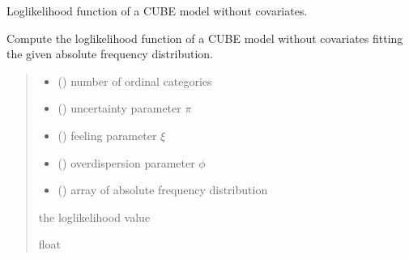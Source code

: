 \documentclass[letterpaper,10pt,english]{sphinxmanual}
\begin{document}

\begin{fulllineitems}
\label{\detokenize{cubmods:cubmods.cube.loglik}}
\pysigstartsignatures
{}
\pysigstopsignatures
\sphinxAtStartPar
Log\sphinxhyphen{}likelihood function of a CUBE model without covariates.

\sphinxAtStartPar
Compute the log\sphinxhyphen{}likelihood function of a CUBE model without covariates fitting 
the given absolute frequency distribution.
\begin{quote}\begin{description}
\begin{itemize}
\item {} 
\sphinxAtStartPar
{} () \textendash{} number of ordinal categories

\item {} 
\sphinxAtStartPar
{} () \textendash{} uncertainty parameter \(\pi\)

\item {} 
\sphinxAtStartPar
{} () \textendash{} feeling parameter \(\xi\)

\item {} 
\sphinxAtStartPar
{} () \textendash{} overdispersion parameter \(\phi\)

\item {} 
\sphinxAtStartPar
{} () \textendash{} array of absolute frequency distribution

\end{itemize}

\sphinxAtStartPar
the log\sphinxhyphen{}likelihood value

\sphinxAtStartPar
float

\end{description}\end{quote}

\end{fulllineitems}
\end{document}
